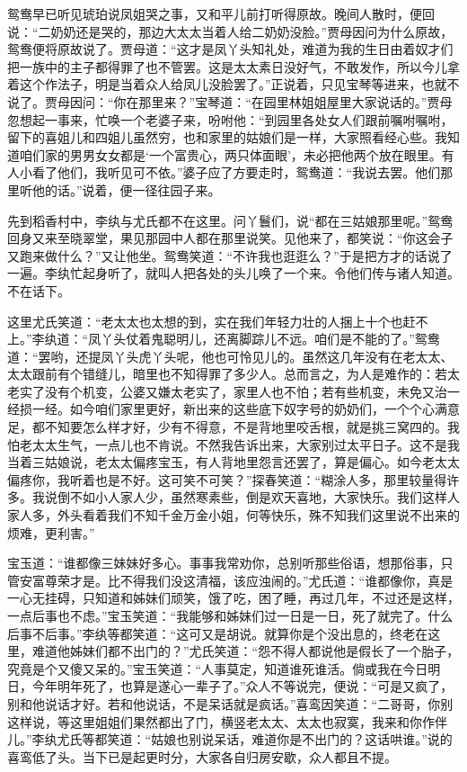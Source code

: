 鸳鸯早已听见琥珀说凤姐哭之事，又和平儿前打听得原故。晚间人散时，便回说：“二奶奶还是哭的，那边大太太当着人给二奶奶没脸。”贾母因问为什么原故，鸳鸯便将原故说了。贾母道：“这才是凤丫头知礼处，难道为我的生日由着奴才们把一族中的主子都得罪了也不管罢。这是太太素日没好气，不敢发作，所以今儿拿着这个作法子，明是当着众人给凤儿没脸罢了。”正说着，只见宝琴等进来，也就不说了。贾母因问：“你在那里来？”宝琴道：“在园里林姐姐屋里大家说话的。”贾母忽想起一事来，忙唤一个老婆子来，吩咐他：“到园里各处女人们跟前嘱咐嘱咐，留下的喜姐儿和四姐儿虽然穷，也和家里的姑娘们是一样，大家照看经心些。我知道咱们家的男男女女都是‘一个富贵心，两只体面眼’，未必把他两个放在眼里。有人小看了他们，我听见可不依。”婆子应了方要走时，鸳鸯道：“我说去罢。他们那里听他的话。”说着，便一径往园子来。

先到稻香村中，李纨与尤氏都不在这里。问丫鬟们，说“都在三姑娘那里呢。”鸳鸯回身又来至晓翠堂，果见那园中人都在那里说笑。见他来了，都笑说：“你这会子又跑来做什么？”又让他坐。鸳鸯笑道：“不许我也逛逛么？”于是把方才的话说了一遍。李纨忙起身听了，就叫人把各处的头儿唤了一个来。令他们传与诸人知道。不在话下。

这里尤氏笑道：“老太太也太想的到，实在我们年轻力壮的人捆上十个也赶不上。”李纨道：“凤丫头仗着鬼聪明儿，还离脚踪儿不远。咱们是不能的了。”鸳鸯道：“罢哟，还提凤丫头虎丫头呢，他也可怜见儿的。虽然这几年没有在老太太、太太跟前有个错缝儿，暗里也不知得罪了多少人。总而言之，为人是难作的：若太老实了没有个机变，公婆又嫌太老实了，家里人也不怕；若有些机变，未免又治一经损一经。如今咱们家里更好，新出来的这些底下奴字号的奶奶们，一个个心满意足，都不知要怎么样才好，少有不得意，不是背地里咬舌根，就是挑三窝四的。我怕老太太生气，一点儿也不肯说。不然我告诉出来，大家别过太平日子。这不是我当着三姑娘说，老太太偏疼宝玉，有人背地里怨言还罢了，算是偏心。如今老太太偏疼你，我听着也是不好。这可笑不可笑？”探春笑道：“糊涂人多，那里较量得许多。我说倒不如小人家人少，虽然寒素些，倒是欢天喜地，大家快乐。我们这样人家人多，外头看着我们不知千金万金小姐，何等快乐，殊不知我们这里说不出来的烦难，更利害。”

宝玉道：“谁都像三妹妹好多心。事事我常劝你，总别听那些俗语，想那俗事，只管安富尊荣才是。比不得我们没这清福，该应浊闹的。”尤氏道：“谁都像你，真是一心无挂碍，只知道和姊妹们顽笑，饿了吃，困了睡，再过几年，不过还是这样，一点后事也不虑。”宝玉笑道：“我能够和姊妹们过一日是一日，死了就完了。什么后事不后事。”李纨等都笑道：“这可又是胡说。就算你是个没出息的，终老在这里，难道他姊妹们都不出门的？”尤氏笑道：“怨不得人都说他是假长了一个胎子，究竟是个又傻又呆的。”宝玉笑道：“人事莫定，知道谁死谁活。倘或我在今日明日，今年明年死了，也算是遂心一辈子了。”众人不等说完，便说：“可是又疯了，别和他说话才好。若和他说话，不是呆话就是疯话。”喜鸾因笑道：“二哥哥，你别这样说，等这里姐姐们果然都出了门，横竖老太太、太太也寂寞，我来和你作伴儿。”李纨尤氏等都笑道：“姑娘也别说呆话，难道你是不出门的？这话哄谁。”说的喜鸾低了头。当下已是起更时分，大家各自归房安歇，众人都且不提。

